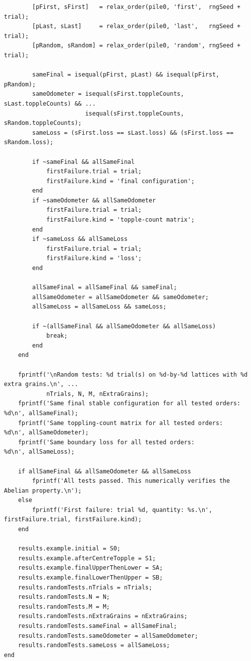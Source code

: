 \documentclass{article}
\begin{document}
\begin{lstlisting}
        [pFirst, sFirst]   = relax_order(pile0, 'first',  rngSeed + trial);
        [pLast, sLast]     = relax_order(pile0, 'last',   rngSeed + trial);
        [pRandom, sRandom] = relax_order(pile0, 'random', rngSeed + trial);

        sameFinal = isequal(pFirst, pLast) && isequal(pFirst, pRandom);
        sameOdometer = isequal(sFirst.toppleCounts, sLast.toppleCounts) && ...
                       isequal(sFirst.toppleCounts, sRandom.toppleCounts);
        sameLoss = (sFirst.loss == sLast.loss) && (sFirst.loss == sRandom.loss);

        if ~sameFinal && allSameFinal
            firstFailure.trial = trial;
            firstFailure.kind = 'final configuration';
        end
        if ~sameOdometer && allSameOdometer
            firstFailure.trial = trial;
            firstFailure.kind = 'topple-count matrix';
        end
        if ~sameLoss && allSameLoss
            firstFailure.trial = trial;
            firstFailure.kind = 'loss';
        end

        allSameFinal = allSameFinal && sameFinal;
        allSameOdometer = allSameOdometer && sameOdometer;
        allSameLoss = allSameLoss && sameLoss;

        if ~(allSameFinal && allSameOdometer && allSameLoss)
            break;
        end
    end

    fprintf('\nRandom tests: %d trial(s) on %d-by-%d lattices with %d extra grains.\n', ...
            nTrials, N, M, nExtraGrains);
    fprintf('Same final stable configuration for all tested orders: %d\n', allSameFinal);
    fprintf('Same toppling-count matrix for all tested orders:       %d\n', allSameOdometer);
    fprintf('Same boundary loss for all tested orders:              %d\n', allSameLoss);

    if allSameFinal && allSameOdometer && allSameLoss
        fprintf('All tests passed. This numerically verifies the Abelian property.\n');
    else
        fprintf('First failure: trial %d, quantity: %s.\n', firstFailure.trial, firstFailure.kind);
    end

    results.example.initial = S0;
    results.example.afterCentreTopple = S1;
    results.example.finalUpperThenLower = SA;
    results.example.finalLowerThenUpper = SB;
    results.randomTests.nTrials = nTrials;
    results.randomTests.N = N;
    results.randomTests.M = M;
    results.randomTests.nExtraGrains = nExtraGrains;
    results.randomTests.sameFinal = allSameFinal;
    results.randomTests.sameOdometer = allSameOdometer;
    results.randomTests.sameLoss = allSameLoss;
end


\end{lstlisting}
\end{document}
